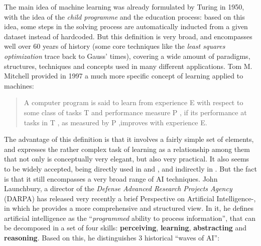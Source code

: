 The main idea of machine learning was already formulated by Turing in 1950, with the idea of the {\it child programme} and the education process\cite{turing:50}: based on this idea, some steps in the solving process are automatically inducted from a given dataset instead of hardcoded. But this definition is very broad, and encompasses well over 60 years of history (some core techniques like the {\it least squares optimization} trace back to Gauss' times\cite{lso}), covering a wide amount of paradigms, structures, techniques and concepts used in many different applications. Tom M. Mitchell provided in 1997 a much more specific concept of learning applied to machines\cite[p.99]{goodfellow}:
\begin{quote}
  A computer program is said to learn from experience E with respect to some class of tasks T and performance measure P , if its performance at tasks in T , as measured by P ,improves with experience E.
\end{quote}
The advantage of this definition is that it involves a fairly simple set of elements, and expresses the rather complex task of learning as a relationship among them that not only is conceptually very elegant, but also very practical. It also seems to be widely accepted, being directly used in \cite{goodfellow} and \cite{coursera-ml}, and indirectly in \cite{russell}. But the fact is that it still encompasses a very broad range of AI techniques. John Launchbury, a director of the {\it Defense Advanced Research Projects Agency} (DARPA) has released very recently a brief Perspective on Artificial Intelligence\cite{darpa-slides}-\cite{darpa-vid}, in which he provides a more comprehensive and structured view. In it, he defines artificial intelligence as the ``{\it programmed} ability to process information'', that can be decomposed in a set of four skills: \textbf{perceiving}, \textbf{learning}, \textbf{abstracting} and \textbf{reasoning}. Based on this, he distinguishes 3 historical ``waves of AI'':
